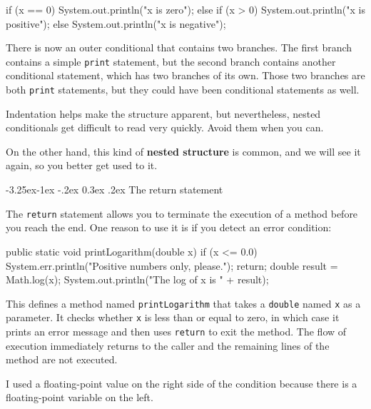 \documentclass[12pt]{book}
\makeatletter
\renewcommand\subsection{\@startsection{subsection}{2}{\z@}%
    {-3.25ex\@plus -1ex \@minus -.2ex}%
    {0.3ex \@plus .2ex}%
    {\normalfont\large\bfseries}}
\theoremstyle{exercise}
\makeatother
\begin{document}
\begin{code}
    if (x == 0) {
        System.out.println("x is zero");
    } else {
        if (x > 0) {
            System.out.println("x is positive");
        } else {
            System.out.println("x is negative");
        }
    }
\end{code}

There is now an outer conditional that contains two branches.
The first branch contains a simple {\tt print} statement, but the second branch contains another conditional statement, which has two branches of its own.
Those two branches are both {\tt print} statements, but they could have been conditional statements as well.

Indentation helps make the structure apparent, but nevertheless, nested conditionals get difficult to read very quickly.
Avoid them when you can.


On the other hand, this kind of {\bf nested structure} is common, and we will see it again, so you better get used to it.

\subsection{The return statement}


The {\tt return} statement allows you to terminate the execution of a method before you reach the end.
One reason to use it is if you detect an error condition:

\begin{code}
    public static void printLogarithm(double x) {
        if (x <= 0.0) {
            System.err.println("Positive numbers only, please.");
            return;
        }
        double result = Math.log(x);
        System.out.println("The log of x is " + result);
    }
\end{code}

This defines a method named {\tt printLogarithm} that takes a {\tt  double} named {\tt x} as a parameter.
It checks whether {\tt  x} is less than or equal to zero, in which case it prints an error message and then uses {\tt return} to exit the method.
The flow of execution immediately returns to the caller and the remaining lines of the method are not executed.

I used a floating-point value on the right side of the condition because there is a floating-point variable on the left.
\end{document}
